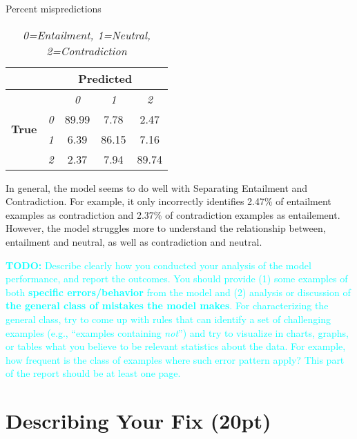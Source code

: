 \documentclass[twocolumn]{article}
\newcommand{\todo}[1]{\textcolor{cyan}{\textbf{TODO:} #1}}
\begin{document}
\begin{table}[]
\caption{Percent mispredictions}
\begin{tabular}{|l|cccc|}
\hline
                               & \multicolumn{4}{c|}{\textbf{Predicted}}                                                                          \\ \hline
\multirow{4}{*}{\textbf{True}} & \multicolumn{1}{l|}{}           & \multicolumn{1}{c|}{\textit{0}} & \multicolumn{1}{c|}{\textit{1}} & \textit{2} \\ \cline{2-5} 
                               & \multicolumn{1}{c|}{\textit{0}} & \multicolumn{1}{c|}{89.99}      & \multicolumn{1}{c|}{7.78}       & 2.47       \\ \cline{2-5} 
                               & \multicolumn{1}{c|}{\textit{1}} & \multicolumn{1}{c|}{6.39}       & \multicolumn{1}{c|}{86.15}      & 7.16       \\ \cline{2-5} 
                               & \multicolumn{1}{c|}{\textit{2}} & \multicolumn{1}{c|}{2.37}       & \multicolumn{1}{c|}{7.94}       & 89.74      \\ \hline
\end{tabular}
\caption*{\textit{ 0=Entailment, 1=Neutral, 2=Contradiction }}
\end{table}

In general, the model seems to do well with Separating Entailment and
Contradiction. For example, it only incorrectly identifies 2.47\% of entailment
examples as contradiction and 2.37\% of contradiction examples as entailement.
However, the model struggles more to understand the relationship between,
entailment and neutral, as well as contradiction and neutral.

\todo{Describe clearly how you conducted your analysis of the model
performance, and report the outcomes. You should provide (1) some examples of
both \textbf{specific errors/behavior} from the model and (2) analysis or
discussion of \textbf{the general class of mistakes the model makes}. For
characterizing the general class, try to come up with rules that can identify a
set of challenging examples (e.g., ``examples containing \emph{not}'') and try
to visualize in charts, graphs, or tables what you believe to be relevant
statistics about the data. For example, how frequent is the class of examples
where such error pattern apply? This part of the report should be at least one
page.}

\section{Describing Your Fix (20pt)}
\end{document}
